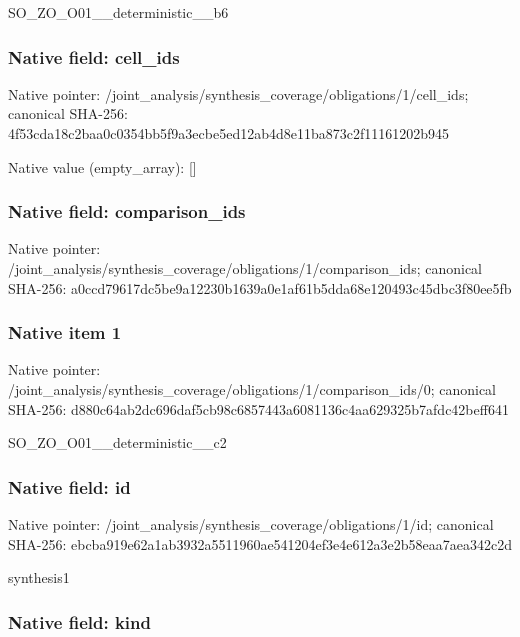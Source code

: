 \documentclass[10pt,a4paper]{article}
\begin{document}
SO\_ZO\_O01\_\_deterministic\_\_b6


\subsubsection{Native field: cell\_ids}


Native pointer: /joint\_analysis/synthesi\allowbreak{}s\_coverage/obligations/1\allowbreak{}/cell\_ids; canonical SHA-256: 4f53cda18c2baa0c0354bb5f\allowbreak{}9a3ecbe5ed12ab4d8e11ba87\allowbreak{}3c2f11161202b945



Native value (empty\_array): []



\subsubsection{Native field: comparison\_ids}


Native pointer: /joint\_analysis/synthesi\allowbreak{}s\_coverage/obligations/1\allowbreak{}/comparison\_ids; canonical SHA-256: a0ccd79617dc5be9a12230b1\allowbreak{}639a0e1af61b5dda68e12049\allowbreak{}3c45dbc3f80ee5fb



\subsubsection{Native item 1}


Native pointer: /joint\_analysis/synthesi\allowbreak{}s\_coverage/obligations/1\allowbreak{}/comparison\_ids/0; canonical SHA-256: d880c64ab2dc696daf5cb98c\allowbreak{}6857443a6081136c4aa62932\allowbreak{}5b7afdc42beff641


SO\_ZO\_O01\_\_deterministic\_\_c2


\subsubsection{Native field: id}


Native pointer: /joint\_analysis/synthesi\allowbreak{}s\_coverage/obligations/1\allowbreak{}/id; canonical SHA-256: ebcba919e62a1ab3932a5511\allowbreak{}960ae541204ef3e4e612a3e2\allowbreak{}b58eaa7aea342c2d


synthesis1


\subsubsection{Native field: kind}
\end{document}

